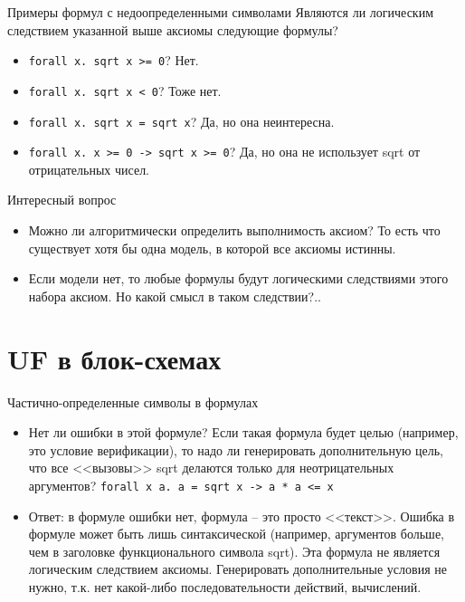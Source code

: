 \documentclass[hyperref={unicode=true}]{beamer}
\begin{document}
    \begin{frame}{Примеры формул с недоопределенными символами}
    Являются ли логическим следствием указанной выше аксиомы
    следующие формулы?
    \begin{itemize}
    \item
    \texttt{forall x. sqrt x >= 0}?
    Нет.
    \item
    \texttt{forall x. sqrt x < 0}?
    Тоже нет.
    \item
    \texttt{forall x. sqrt x = sqrt x}?
    Да, но она неинтересна.
    \item
    \texttt{forall x. x >= 0 -> sqrt x >= 0}?
    Да, но она не использует sqrt от отрицательных чисел.
    \end{itemize}
    \end{frame}

    \begin{frame}{Интересный вопрос}
    \begin{itemize}
    \item
    Можно ли алгоритмически определить выполнимость аксиом?
    То есть что существует хотя бы одна модель, в которой все аксиомы
    истинны.
    \item
    Если модели нет, то любые формулы будут логическими следствиями
    этого набора аксиом. Но какой смысл в таком следствии?..
    \end{itemize}
    \end{frame}

    \section{UF в блок-схемах}

    \begin{frame}{Частично-определенные символы в формулах}
    \begin{itemize}
    \item
    Нет ли ошибки в этой формуле? Если такая формула будет
    целью (например, это условие верификации), то надо ли
    генерировать дополнительную цель, что все <<вызовы>>
    sqrt делаются только для неотрицательных аргументов?
    \texttt{forall x a. a = sqrt x -> a * a <= x}
    \item
    Ответ: в формуле ошибки нет, формула -- это просто <<текст>>.
    Ошибка в формуле может быть лишь синтаксической (например,
    аргументов больше, чем в заголовке функционального символа sqrt).
    Эта формула не является логическим следствием аксиомы.
    Генерировать дополнительные условия не нужно, т.к. нет
    какой-либо последовательности действий, вычислений.
    \end{itemize}
    \end{frame}
\end{document}
